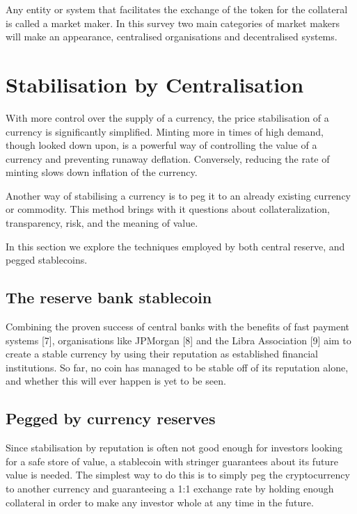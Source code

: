 \documentclass[english,]{IEEEtran}
\begin{document}
Any entity or system that facilitates the exchange of the token for the
collateral is called a market maker. In this survey two main categories
of market makers will make an appearance, centralised organisations and
decentralised systems.

\section{Stabilisation by
Centralisation}\label{stabilisation-by-centralisation}

With more control over the supply of a currency, the price stabilisation
of a currency is significantly simplified. Minting more in times of high
demand, though looked down upon, is a powerful way of controlling the
value of a currency and preventing runaway deflation. Conversely,
reducing the rate of minting slows down inflation of the currency.

Another way of stabilising a currency is to peg it to an already
existing currency or commodity. This method brings with it questions
about collateralization, transparency, risk, and the meaning of value.

In this section we explore the techniques employed by both central
reserve, and pegged stablecoins.

\subsection{The reserve bank
stablecoin}\label{the-reserve-bank-stablecoin}

Combining the proven success of central banks with the benefits of fast
payment systems {[}7{]}, organisations like JPMorgan {[}8{]} and the
Libra Association {[}9{]} aim to create a stable currency by using their
reputation as established financial institutions. So far, no coin has
managed to be stable off of its reputation alone, and whether this will
ever happen is yet to be seen.

\subsection{Pegged by currency
reserves}\label{pegged-by-currency-reserves}

Since stabilisation by reputation is often not good enough for investors
looking for a safe store of value, a stablecoin with stringer guarantees
about its future value is needed. The simplest way to do this is to
simply peg the cryptocurrency to another currency and guaranteeing a 1:1
exchange rate by holding enough collateral in order to make any investor
whole at any time in the future.
\end{document}
